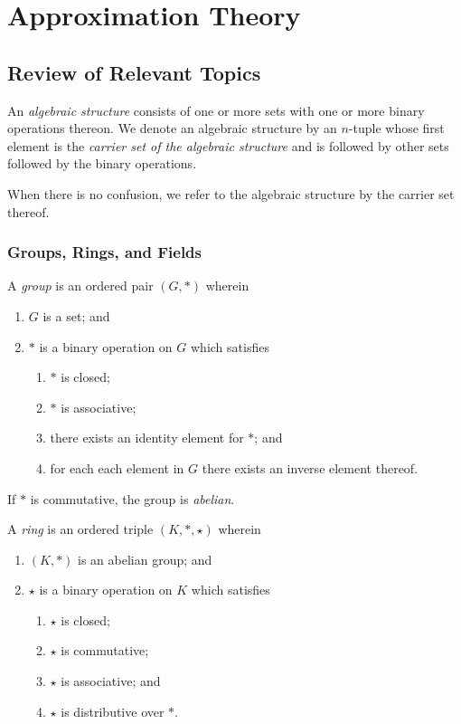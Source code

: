 



\section{Approximation Theory}

\subsection{Review of Relevant Topics}

An \emph{algebraic structure} consists of one or more sets with one or more binary operations thereon. We denote an
algebraic structure by an \(n\)-tuple whose first element is the \emph{carrier set of the algebraic structure} and is
followed by other sets followed by the binary operations.

When there is no confusion, we refer to the algebraic structure by the carrier set thereof.

\subsubsection{Groups, Rings, and Fields}

\Bdf
  A \emph{group} is an ordered pair \((G, *)\) wherein
  \begin{enumerate}
    \item \(G\) is a set; and
    \item \(*\) is a binary operation on \(G\) which satisfies
    \begin{enumerate}
      \item \(*\) is closed;
      \item \(*\) is associative;
      \item there exists an identity element for \(*\); and
      \item for each each element in \(G\) there exists an inverse element thereof.
    \end{enumerate}
  \end{enumerate}

  If \(*\) is commutative, the group is \emph{abelian}.
\Edf

\Bdf
  A \emph{ring} is an ordered triple \((K, *, \star)\) wherein
  \begin{enumerate}
    \item \((K, *)\) is an abelian group; and
    \item \(\star\) is a binary operation on \(K\) which satisfies
    \begin{enumerate}
      \item \(\star\) is closed;
      \item \(\star\) is commutative;
      \item \(\star\) is associative; and
      \item \(\star\) is distributive over \(*\).
    \end{enumerate}
  \end{enumerate}


